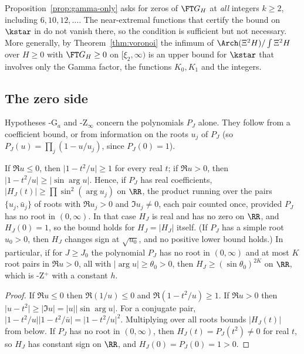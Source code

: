 \begin{remark}\label{rem:gamma-only}
Proposition~\ref{prop:gamma-only} asks for zeros of $\FT G_H$ at \emph{all} integers $k\ge2$, including
$6,10,12,\dots$. The near-extremal functions that certify the bound on $\kstar$ in \cite{PaperI} do not vanish there, so the
condition is sufficient but not necessary. More generally, by Theorem~\ref{thm:voronoi} the infimum of
$\Arch(\Xi^2H)/\int\Xi^2H$ over $H\ge0$ with $\FT G_H\ge0$ on $[\xi_2,\infty)$ is an upper bound for
$\kstar$ that involves only the Gamma factor, the functions $K_0,K_1$ and the integers.
\end{remark}

\subsection{The zero side}\label{ssec:zeroside}

Hypotheses \hyp{G$_a$} and \hyp{Z$_\infty$} concern the polynomials $P_J$ alone. They follow from a coefficient bound, or
from information on the roots $u_j$ of $P_J$ (so $P_J(u)=\prod_j(1-u/u_j)$, since $P_J(0)=1$).

\begin{lemma}\label{lem:rootL}
If $\Re u\le0$, then $\lvert1-t^2/u\rvert\ge1$ for every real $t$; if $\Re u>0$, then $\lvert1-t^2/u\rvert\ge\lvert\sin\arg u\rvert$. Hence, if
$P_J$ has real coefficients, $\lvert H_J(t)\rvert\ge\prod\sin^2(\arg u_j)$ on $\RR$, the product running over the pairs
$\{u_j,\bar u_j\}$ of roots with $\Re u_j>0$ and $\Im u_j\ne0$, each pair counted once, provided $P_J$ has no root in
$(0,\infty)$. In that case $H_J$ is real and has no zero on $\RR$, and $H_J(0)=1$, so the bound holds for $H_J=\lvert H_J\rvert$
itself. (If $P_J$ has a simple root $u_0>0$, then $H_J$ changes sign at $\sqrt{u_0}$, and no positive lower bound holds.)
In particular, if for $J\ge J_0$ the polynomial $P_J$ has no root in $(0,\infty)$ and at most $K$ root pairs in $\Re u>0$, all
with $\lvert\arg u\rvert\ge\theta_0>0$, then $H_J\ge(\sin\theta_0)^{2K}$ on $\RR$, which is \hyp{Z$^+$} with a constant $h$.
\end{lemma}

\begin{proof}
If $\Re u\le0$ then $\Re(1/u)\le0$ and $\Re(1-t^2/u)\ge1$. If $\Re u>0$ then
$\lvert u-t^2\rvert\ge\lvert\Im u\rvert=\lvert u\rvert\lvert\sin\arg u\rvert$. For a conjugate pair,
$\lvert1-t^2/u\rvert\lvert1-t^2/\bar u\rvert=\lvert1-t^2/u\rvert^2$. Multiplying over all roots bounds $\lvert H_J(t)\rvert$ from below.
If $P_J$ has no root in $(0,\infty)$, then $H_J(t)=P_J(t^2)\ne0$ for real $t$, so $H_J$ has constant sign on $\RR$, and
$H_J(0)=P_J(0)=1>0$.
\end{proof}

